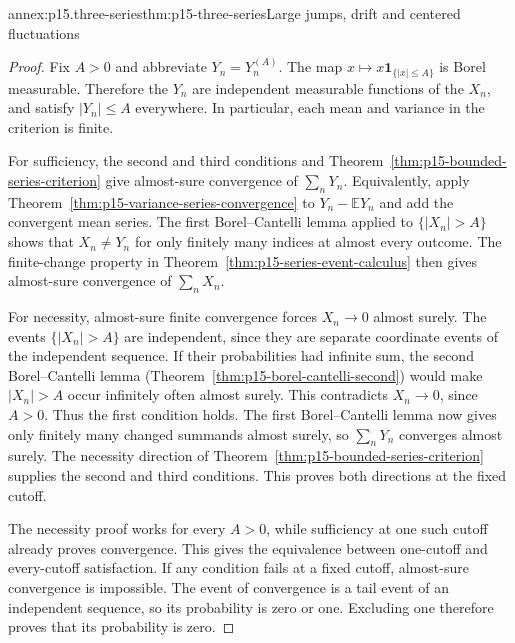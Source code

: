 \begin{annexitem}{annex:p15.three-series}{thm:p15-three-series}{Large jumps, drift and centered fluctuations}
\begin{proof}
Fix \(A>0\) and abbreviate \(Y_n=Y_n^{(A)}\). The map
\(x\mapsto x\mathbf1_{\{|x|\leq A\}}\) is Borel measurable.
Therefore the \(Y_n\) are independent measurable functions of the
\(X_n\), and satisfy \(|Y_n|\leq A\) everywhere. In particular,
each mean and variance in the criterion is finite.

For sufficiency, the second and third conditions and
Theorem~\ref{thm:p15-bounded-series-criterion} give almost-sure
convergence of \(\sum_nY_n\). Equivalently, apply
Theorem~\ref{thm:p15-variance-series-convergence} to
\(Y_n-\mathbb EY_n\) and add the convergent mean series.
The first Borel--Cantelli lemma applied to \(\{|X_n|>A\}\)
shows that \(X_n\neq Y_n\) for only finitely many indices at
almost every outcome. The finite-change property in
Theorem~\ref{thm:p15-series-event-calculus} then gives almost-sure
convergence of \(\sum_nX_n\).

For necessity, almost-sure finite convergence forces \(X_n\to0\)
almost surely. The events \(\{|X_n|>A\}\) are independent,
since they are separate coordinate events of the independent sequence.
If their probabilities had infinite sum, the second Borel--Cantelli
lemma (Theorem~\ref{thm:p15-borel-cantelli-second}) would make
\(|X_n|>A\) occur infinitely often almost surely. This contradicts
\(X_n\to0\), since \(A>0\). Thus the first condition holds.
The first Borel--Cantelli lemma now gives only finitely many changed
summands almost surely, so \(\sum_nY_n\) converges almost surely.
The necessity direction of
Theorem~\ref{thm:p15-bounded-series-criterion} supplies the second
and third conditions. This proves both directions at the fixed cutoff.

The necessity proof works for every \(A>0\), while sufficiency at
one such cutoff already proves convergence. This gives the equivalence
between one-cutoff and every-cutoff satisfaction. If any condition
fails at a fixed cutoff, almost-sure convergence is impossible.
The event of convergence is a tail event of an independent sequence,
so its probability is zero or one. Excluding one therefore proves
that its probability is zero.
\end{proof}
\end{annexitem}

